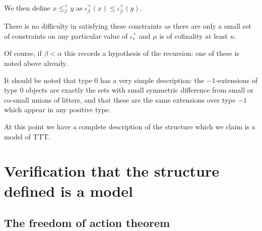 \documentclass[112pt]{article}
\begin{document}
\begin{description}
\begin{enumerate}
\end{enumerate}

We then define $x \leq^+_\beta y$ as $\iota^+_\beta(x) \leq \iota^+_\beta(y)$.

There is no difficulty in satisfying these constraints as there are only a small set of constraints on any particular value of $\iota_*^+$ and $\mu$ is of cofinality at least $\kappa$.

Of course, if $\beta<\alpha$ this records a hypothesis of the recursion:  one of these is noted above already.


   It should be noted that type 0 has a very simple description:  the $-1$-extensions of type 0 objects are exactly the sets with small symmetric difference from small or co-small unions of litters, and that these are the same extensions over type $-1$ which appear in any positive type.


At this point we have a complete description of the structure which we claim is a model of TTT.


\end{description}

\section{Verification that the structure defined is a model}

\subsection{The freedom of action theorem}
\end{document}
